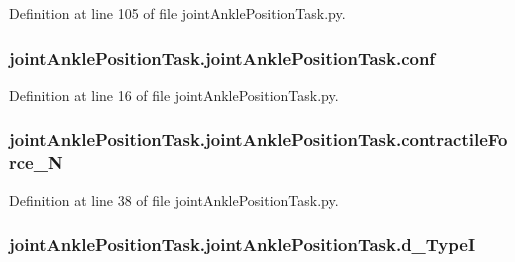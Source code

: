 Definition at line 105 of file joint\+Ankle\+Position\+Task.\+py.

\subsubsection[{\texorpdfstring{conf}{conf}}]{\setlength{\rightskip}{0pt plus 5cm}joint\+Ankle\+Position\+Task.\+joint\+Ankle\+Position\+Task.\+conf}\hypertarget{classjoint_ankle_position_task_1_1joint_ankle_position_task_af106c2701a40941b1ad8cf82d6866cab}{}\label{classjoint_ankle_position_task_1_1joint_ankle_position_task_af106c2701a40941b1ad8cf82d6866cab}


Definition at line 16 of file joint\+Ankle\+Position\+Task.\+py.

\subsubsection[{\texorpdfstring{contractile\+Force\+\_\+N}{contractileForce_N}}]{\setlength{\rightskip}{0pt plus 5cm}joint\+Ankle\+Position\+Task.\+joint\+Ankle\+Position\+Task.\+contractile\+Force\+\_\+N}\hypertarget{classjoint_ankle_position_task_1_1joint_ankle_position_task_adb7a2c3b675261450a013881a0e17f35}{}\label{classjoint_ankle_position_task_1_1joint_ankle_position_task_adb7a2c3b675261450a013881a0e17f35}


Definition at line 38 of file joint\+Ankle\+Position\+Task.\+py.

\subsubsection[{\texorpdfstring{d\+\_\+\+TypeI}{d_TypeI}}]{\setlength{\rightskip}{0pt plus 5cm}joint\+Ankle\+Position\+Task.\+joint\+Ankle\+Position\+Task.\+d\+\_\+\+TypeI}\hypertarget{classjoint_ankle_position_task_1_1joint_ankle_position_task_a876694feca632d027fc7737dfedd3aa2}{}\label{classjoint_ankle_position_task_1_1joint_ankle_position_task_a876694feca632d027fc7737dfedd3aa2}


